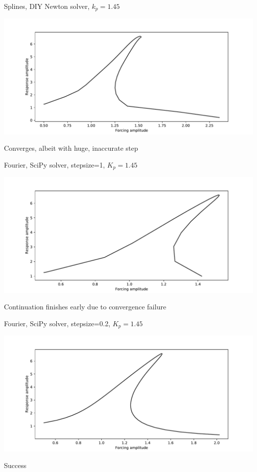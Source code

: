 \documentclass[presentation]{beamer}
\begin{document}
\begin{frame}[label={sec:org0138472}]{Splines, DIY Newton solver, \(k_p=1.45\)}
\begin{center}
\includegraphics[width=.9\linewidth]{./kp1d35_transtime100_newton.pdf}
\end{center}

Converges, albeit with huge, inaccurate step 
\end{frame}

\begin{frame}[label={sec:org106d2e2}]{Fourier, SciPy solver, stepsize=1, \(K_p=1.45\)}
\begin{center}
\includegraphics[width=.9\linewidth]{./kp1d45_transtime100_scipy_fourier.pdf}
\end{center}

Continuation finishes early due to convergence failure
\end{frame}

\begin{frame}[label={sec:orga09fe90}]{Fourier, SciPy solver, stepsize=0.2, \(K_p=1.45\)}
\begin{center}
\includegraphics[width=.9\linewidth]{./kp1d45_transtime100_scipy_fourier_ss0d2.pdf}
\end{center}

Success
\end{frame}
\end{document}
